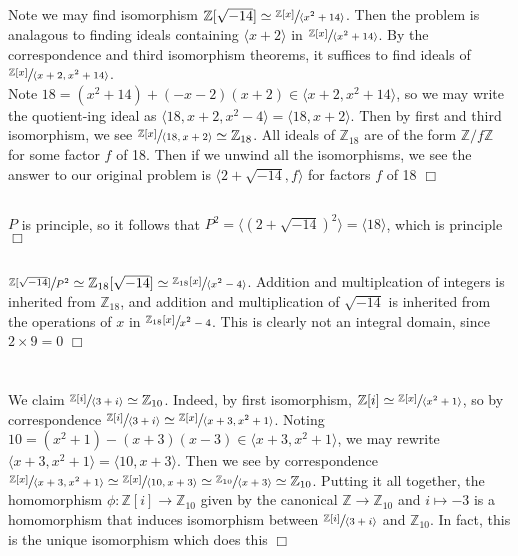 \documentclass{article}
\begin{document}
\subsection{}
Note we may find isomorphism $\mathbb{Z}[\sqrt{-14}] \simeq \sfrac{\mathbb{Z}[x]}{\langle x^2+14 \rangle}$. Then the problem is analagous to finding ideals containing $\langle x+2 \rangle$ in $\sfrac{\mathbb{Z}[x]}{\langle x^2+14 \rangle}$. By the correspondence and third isomorphism theorems, it suffices to find ideals of $\sfrac{\mathbb{Z}[x]}{\langle x+2, x^2+14 \rangle}$.\\
Note $18 = (x^2+14) + (-x-2)(x+2) \in \langle x+2, x^2+14 \rangle$, so we may write the quotient-ing ideal as $\langle 18, x+2, x^2-4 \rangle = \langle 18, x+2 \rangle$. Then by first and third isomorphism, we see $\sfrac{\mathbb{Z}[x]}{\langle 18, x+2 \rangle} \simeq \mathbb{Z}_{18}$. All ideals of $\mathbb{Z}_{18}$ are of the form $\mathbb{Z}/f\mathbb{Z}$ for some factor $f$ of 18. Then if we unwind all the isomorphisms, we see the answer to our original problem is $\langle 2 + \sqrt{-14}, f \rangle$ for factors $f$ of 18 $\Box$
\subsection{}
$P$ is principle, so it follows that $P^2 = \langle (2+\sqrt{-14})^2 \rangle = \langle 18 \rangle$, which is principle $\Box$
\subsection{}
$\sfrac{\mathbb{Z}[\sqrt{-14}]}{P^2} \simeq \mathbb{Z}_{18}[\sqrt{-14}] \simeq \sfrac{\mathbb{Z}_{18}[x]}{\langle x^2-4 \rangle}$. Addition and multiplcation of integers is inherited from $\mathbb{Z}_{18}$, and addition and multiplication of $\sqrt{-14}$ is inherited from the operations of $x$ in $\sfrac{\mathbb{Z}_{18}[x]}{x^2-4}$. This is clearly not an integral domain, since $2 \times 9 = 0$ $\Box$

\section{}
We claim $\sfrac{\mathbb{Z}[i]}{\langle 3+i \rangle} \simeq \mathbb{Z}_{10}$. Indeed, by first isomorphism, $\mathbb{Z}[i] \simeq \sfrac{\mathbb{Z}[x]}{\langle x^2 + 1 \rangle}$, so by correspondence $\sfrac{\mathbb{Z}[i]}{\langle 3+i \rangle} \simeq \sfrac{\mathbb{Z}[x]}{\langle x+3, x^2+1 \rangle}$. Noting $10 = (x^2+1) - (x+3)(x-3) \in \langle x+3, x^2+1 \rangle$, we may rewrite $\langle x+3, x^2+1 \rangle = \langle 10, x+3 \rangle$. Then we see by correspondence $\sfrac{\mathbb{Z}[x]}{\langle x+3, x^2+1 \rangle} \simeq \sfrac{\mathbb{Z}[x]}{\langle 10, x+3 \rangle} \simeq \sfrac{\mathbb{Z}_{10}}{\langle x+3 \rangle} \simeq \mathbb{Z}_{10}$. Putting it all together, the homomorphism $\phi : \mathbb{Z}[i] \to \mathbb{Z}_{10}$ given by the canonical $\mathbb{Z} \to \mathbb{Z}_{10}$ and $i \mapsto -3$ is a homomorphism that induces isomorphism between $\sfrac{\mathbb{Z}[i]}{\langle 3+i \rangle}$ and $\mathbb{Z}_{10}$. In fact, this is the unique isomorphism which does this $\Box$
\end{document}
